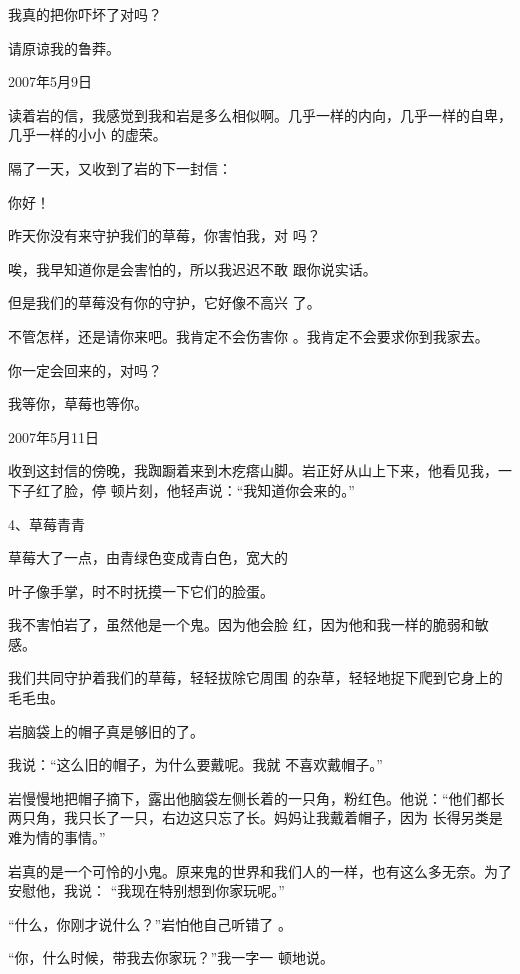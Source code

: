 \documentclass{article}
\begin{document}
\newpage

我真的把你吓坏了对吗？ 


请原谅我的鲁莽。 



2007年5月9日 

读着岩的信，我感觉到我和岩是多么相似啊。几乎一样的内向，几乎一样的自卑，几乎一样的小小
的虚荣。 


隔了一天，又收到了岩的下一封信： 



你好！ 

昨天你没有来守护我们的草莓，你害怕我，对
吗？ 

唉，我早知道你是会害怕的，所以我迟迟不敢
跟你说实话。 

\newpage

但是我们的草莓没有你的守护，它好像不高兴
了。 

不管怎样，还是请你来吧。我肯定不会伤害你
。我肯定不会要求你到我家去。 


你一定会回来的，对吗？ 


我等你，草莓也等你。 



2007年5月11日 

收到这封信的傍晚，我踟蹰着来到木疙瘩山脚。岩正好从山上下来，他看见我，一下子红了脸，停
顿片刻，他轻声说：“我知道你会来的。” 


4、草莓青青 

草莓大了一点，由青绿色变成青白色，宽大的

\newpage
叶子像手掌，时不时抚摸一下它们的脸蛋。 

我不害怕岩了，虽然他是一个鬼。因为他会脸
红，因为他和我一样的脆弱和敏感。 

我们共同守护着我们的草莓，轻轻拔除它周围
的杂草，轻轻地捉下爬到它身上的毛毛虫。 


岩脑袋上的帽子真是够旧的了。 

我说：“这么旧的帽子，为什么要戴呢。我就
不喜欢戴帽子。” 

岩慢慢地把帽子摘下，露出他脑袋左侧长着的一只角，粉红色。他说：“他们都长两只角，我只长了一只，右边这只忘了长。妈妈让我戴着帽子，因为
长得另类是难为情的事情。” 

岩真的是一个可怜的小鬼。原来鬼的世界和我们人的一样，也有这么多无奈。为了安慰他，我说：
“我现在特别想到你家玩呢。” 

\newpage

“什么，你刚才说什么？”岩怕他自己听错了
。 

“你，什么时候，带我去你家玩？”我一字一
顿地说。 
\end{document}
